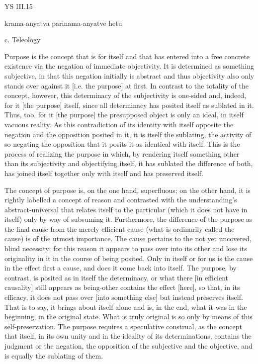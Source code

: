 YS III.15

krama-anyatva parinama-anyatve hetu

c. Teleology

Purpose is the concept that is for itself
and that has entered into a free concrete existence
via the negation of immediate objectivity.
It is determined as something subjective,
in that this negation initially is abstract
and thus objectivity also only stands
over against it [i.e. the purpose] at first.
In contrast to the totality of the concept, however,
this determinacy of the subjectivity is one-sided and, indeed,
for it [the purpose] itself, since all determinacy has posited
itself as sublated in it.
Thus, too, for it [the purpose] the presupposed object is
only an ideal, in itself vacuous reality.
As this contradiction of its identity
with itself opposite the negation
and the opposition posited in it,
it is itself the sublating,
the activity of so negating the opposition
that it posits it as identical with itself.
This is the process of realizing the purpose in which,
by rendering itself something other than its subjectivity
and objectifying itself,
it has sublated the difference of both,
has joined itself together only with itself
and has preserved itself.

The concept of purpose is, on the one hand, superfluous;
on the other hand, it is rightly labelled a concept of reason
and contrasted with the understanding's abstract-universal
that relates itself to the particular
(which it does not have in itself)
only by way of subsuming it.
Furthermore, the difference of the purpose
as the final cause
from the merely efficient cause
(what is ordinarily called the cause)
is of the utmost importance.
The cause pertains to the not yet uncovered, blind necessity;
for this reason it appears to pass over into its other
and lose its originality in it in the course of being posited.
Only in itself or for us is the cause in the effect first a cause,
and does it come back into itself.
The purpose, by contrast, is posited as in itself the determinacy,
or what there [in efficient causality] still appears as being-other
contains the effect [here], so that, in its efficacy,
it does not pass over [into something else]
but instead preserves itself.
That is to say, it brings about itself alone
and is, in the end, what it was in the beginning,
in the original state.
What is truly original is so only
by means of this self-preservation.
The purpose requires a speculative construal,
as the concept that itself,
in its own unity and in the ideality of its determinations,
contains the judgment or the negation,
the opposition of the subjective and the objective,
and is equally the sublating of them.

